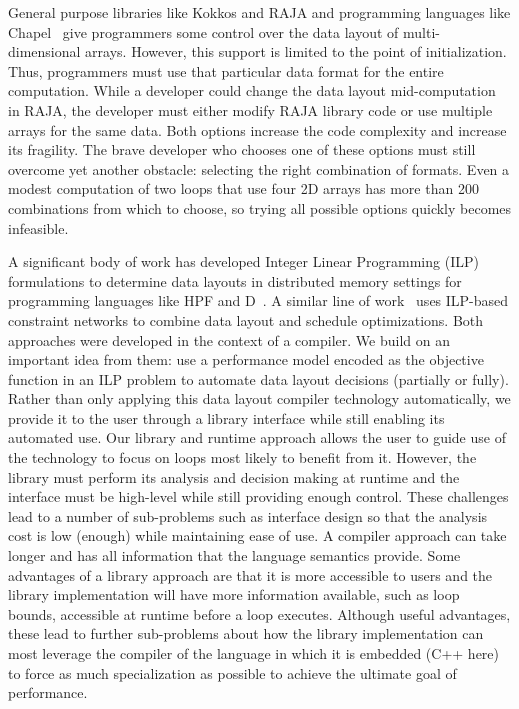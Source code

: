 \documentclass[sigconf,review=true]{acmart}
\begin{document}
General purpose libraries like Kokkos and RAJA and programming languages like Chapel~\cite{diaconescu2007approach} give programmers some control over the data layout of multi-dimensional arrays. However, this support is limited to the point of initialization.
Thus, programmers must use that particular data format for the entire computation.
While a developer could change the data layout mid-computation in RAJA, the developer must either modify RAJA library code or use multiple arrays for the same data. 
Both options increase the code complexity and increase its fragility.
The brave developer who chooses one of these options must still overcome yet another obstacle: selecting the right combination of formats.
Even a modest computation of two loops that use four 2D arrays has more than 200 combinations from which to choose, so trying all possible options quickly becomes infeasible. 

A significant body of work has developed Integer Linear Programming (ILP) formulations to determine data layouts in distributed memory settings for programming languages like HPF and D~\cite{bixby1994automatic,kennedy1995automatic,kennedy1998automatic}. 
A similar line of work~\cite{chen2004ilp,chen2005constraint,chen2005integrating, ozturk2011data} uses ILP-based constraint networks to combine data layout and schedule optimizations. 
Both approaches were developed in the context of a compiler. 
We build on an important idea from them: use a performance model encoded as the objective function in an ILP problem to automate data layout decisions (partially or fully).
Rather than only applying this data layout compiler technology automatically, we provide it to the user through a library interface while still enabling its automated use.
Our library and runtime approach allows the user to guide use of the technology to focus on loops most likely to benefit from it.
However, the library must perform its analysis and decision making at runtime and the interface must be high-level while still providing enough control. 
These challenges lead to a number of sub-problems such as interface design so that the analysis cost is low (enough) while maintaining ease of use.
A compiler approach can take longer and has all information that the language semantics provide.
Some advantages of a library approach are that it is more accessible to users and the library implementation will have more information available, such as loop bounds, accessible at runtime before a loop executes.
Although useful advantages, these lead to further sub-problems about how the library implementation can most leverage the compiler of the language in which it is embedded (C++ here) to force as much specialization as possible to achieve the ultimate goal of performance.
\end{document}
